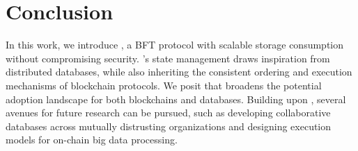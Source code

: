 \section{Conclusion}

In this work, we introduce \sys, a BFT protocol with scalable storage consumption without compromising security.
\sys's state management draws inspiration from distributed databases, while also inheriting the consistent ordering and execution mechanisms of blockchain protocols.
We posit that \sys broadens the potential adoption landscape for both blockchains and databases.
Building upon \sys, several avenues for future research can be pursued, such as developing collaborative databases across mutually distrusting organizations and designing execution models for on-chain big data processing.
